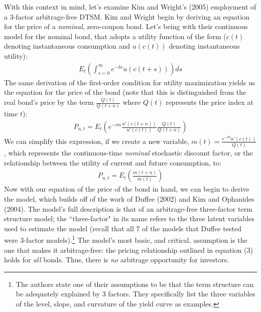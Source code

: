 \documentclass[12pt,final]{article}
\begin{document}
With this context in mind, let's examine Kim and Wright's (2005) employment of a 3-factor arbitrage-free DTSM. Kim and Wright begin by deriving an equation for the price of a \textit{nominal}, zero-coupon bond. Let's being with their continuous model for the nominal bond, that adopts a utility function of the form ($c(t)$ denoting instantaneous consumption and $u(c(t))$ denoting instantaneous utility): 
\begin{gather}
	E_t(\int^\infty_{s = 0} e^{-\delta s}u(c(t+s)))ds
\end{gather}
The same derivation of the first-order condition for utility maximization yields us the equation for the price of the bond (note that this is distinguished from the real bond's price by the term $\frac{Q(t)}{Q(t+n)}$ where $Q(t)$ represents the price index at time $t$):
\begin{gather}
	P_{n,t} = E_t(e^{-\sigma n}\frac{u'(c(t+n))}{u'(c(t))} \frac{Q(t)}{Q(t+n)})
\end{gather}
We can simplify this expression, if we create a new variable, $m(t) = \frac{e^{-\sigma t}u'(c(t))}{Q(t)}$, which represents the continuous-time \textit{nominal} stochastic discount factor, or the relationship between the utility of current and future consumption, to:
\begin{gather}
	P_{n,t} = E_t(\frac{m(t+n)}{m(t)})
\end{gather}
Now with our equation of the price of the bond in hand, we can begin to derive the model, which builds off of the work of Duffee (2002) and Kim and Ophanides (2004). The model's full description is that of an arbitrage-free three-factor term structure model; the ``three-factor" in its name refers to the three latent variables used to estimate the model (recall that all 7 of the models that Duffee tested were 3-factor models).\footnote{The authors state one of their assumptions to be that the term structure can be adequately explained by 3 factors. They specifically list the three variables of the level, slope, and curvature of the yield curve as examples.} \citep{Duffee2002} The model's most basic, and critical, assumption is the one that makes it arbitrage-free: the pricing relationship outlined in equation (3) holds for \textit{all} bonds. Thus, there is \textit{no} arbitrage opportunity for investors. 
\end{document}
